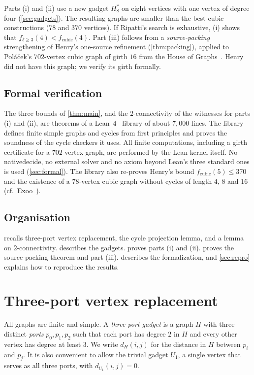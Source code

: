 \documentclass[11pt]{amsart}
\theoremstyle{definition}
\theoremstyle{remark}
\newcommand{\fd}{f_{\delta\ge 3}}
\newcommand{\fc}{f_{\mathrm{cubic}}}
\newcommand{\Height}{H_8^{*}}
\newcommand{\leanus}{\textunderscore\allowbreak}
\newcommand{\lean}[1]{{\ttfamily\let\_\leanus #1}}
\begin{document}
Parts (i) and (ii) use a new gadget $\Height$ on eight vertices with one vertex
of degree four (\cref{sec:gadgets}). The resulting graphs are smaller than the
best cubic constructions ($78$ and $370$ vertices). If Ripatti's search is
exhaustive, (i) shows that $\fd(4)<\fc(4)$. Part (iii) follows from a
\emph{source-packing} strengthening of Henry's one-source refinement
(\cref{thm:packing}), applied to Poláček's $702$-vertex cubic graph of girth
$16$ from the House of Graphs~\cite{HoG}. Henry did not have this graph; we
verify its girth formally.

\subsection*{Formal verification}
The three bounds of \cref{thm:main}, and the $2$-connectivity of the witnesses
for parts (i) and (ii), are theorems of a Lean~4~\cite{Lean4} library of about
$7{,}000$ lines. The library defines finite simple graphs and cycles from first
principles and proves the soundness of the cycle checkers it uses. All finite
computations, including a girth certificate for a $702$-vertex graph, are
performed by the Lean kernel itself. No \lean{native\_decide}, no external
solver and no axiom beyond Lean's three standard ones is used
(\cref{sec:formal}). The library also re-proves Henry's bound $\fc(5)\le 370$
and the existence of a $78$-vertex cubic graph without cycles of length $4$, $8$
and $16$ (cf.\ Exoo~\cite{Exoo2014}).

\subsection*{Organisation}
 recalls three-port vertex replacement, the cycle projection
lemma, and a lemma on $2$-connectivity.  describes the gadgets.  proves parts
(i) and (ii).  proves the source-packing theorem and part
(iii).  describes the formalization, and \cref{sec:repro}
explains how to reproduce the results.

\section{Three-port vertex replacement}\label{sec:lifts}

All graphs are finite and simple. A \emph{three-port gadget} is a graph $H$
with three distinct \emph{ports} $p_0,p_1,p_2$ such that each port has degree
$2$ in $H$ and every other vertex has degree at least $3$. We write
$d_H(i,j)$ for the distance in $H$ between $p_i$ and $p_j$. It is also
convenient to allow the trivial gadget $U_1$, a single vertex that serves as all
three ports, with $d_{U_1}(i,j)=0$.
\end{document}
